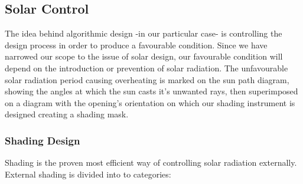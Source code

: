 \subsection{Solar Control}
The idea behind algorithmic design -in our particular case- is controlling the design process
in order to produce a favourable condition. Since we have narrowed our scope to the issue of solar
design, our favourable condition will depend on the introduction or prevention of solar radiation.
The unfavourable solar radiation period causing overheating is marked on the sun path diagram, showing
the angles at which the sun casts it's unwanted rays, then superimposed on a diagram with the
opening's orientation on which our shading instrument is designed creating a shading mask.

\subsubsection{Shading Design}
\label{Shading}
Shading is the proven most efficient way of controlling solar radiation externally. External shading
is divided into to categories:
